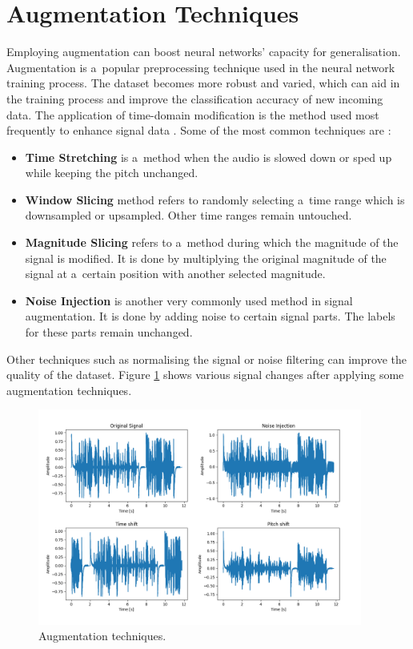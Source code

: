     \newpage
    
    \section{Augmentation Techniques}\label{Augmentation}

    Employing augmentation can boost neural networks' capacity for generalisation. Augmentation is a~popular preprocessing technique used in the neural network training process. The dataset becomes more robust and varied, which can aid in the training process and improve the classification accuracy of new incoming data. The application of time-domain modification is the method used most frequently to enhance signal data \cite{xu2022mixing}. Some of the most common techniques are \cite{DBLP:journals/corr/SalamonB16}:
    
    \begin{itemize}
        \item \textbf{Time Stretching} is a~method when the audio is slowed down or sped up while keeping the pitch unchanged. 
        \item \textbf{Window Slicing} method refers to randomly selecting a~time range which is downsampled or upsampled. Other time ranges remain untouched.
        \item \textbf{Magnitude Slicing} refers to a~method during which the magnitude of the signal is modified. It is done by multiplying the original magnitude of the signal at a~certain position with another selected magnitude.
        \item \textbf{Noise Injection} is another very commonly used method in signal augmentation. It is done by adding noise to certain signal parts. The labels for these parts remain unchanged.
    \end{itemize}

    Other techniques such as normalising the signal or noise filtering can improve the quality of the dataset. Figure \ref{fig:augmentationtechniques} shows various signal changes after applying some augmentation techniques.

    
    \begin{figure}[ht!]
        \centering
        \includegraphics[width = 0.95\textwidth]{obrazky-figures/augmentation.png}
        \caption{Augmentation techniques.}
        \label{fig:augmentationtechniques}
    \end{figure}

